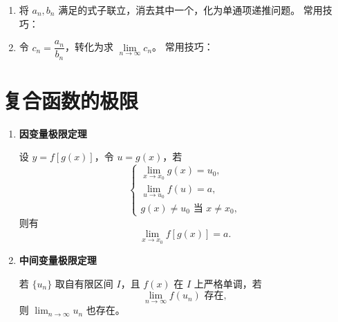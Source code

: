 \begin{enumerate}
    \item 将 $a_n,b_n$ 满足的式子联立，消去其中一个，化为单通项递推问题。
          常用技巧：

    \item 令 $c_n = \dfrac{a_n}{b_n}$，转化为求 $\lim\limits_{n\to\infty} c_n$。
          常用技巧：
\end{enumerate}

\section{复合函数的极限}
\DTwoOne

\begin{enumerate}
    \item \textbf{因变量极限定理}

          设 $y=f[g(x)]$，令 $u=g(x)$，若
          \[
              \begin{cases}
                  \displaystyle \lim_{x\to x_0} g(x) = u_0, \\[3pt]
                  \displaystyle \lim_{u\to u_0} f(u) = a,   \\[3pt]
                  g(x)\ne u_0 \text{ 当 } x\ne x_0,
              \end{cases}
          \]
          则有
          \[
              \lim_{x\to x_0} f[g(x)] = a.
          \]

    \item \textbf{中间变量极限定理}

          若 $\{u_n\}$ 取自有限区间 $I$，且 $f(x)$ 在 $I$ 上严格单调，若
          \[
              \lim_{n\to\infty} f(u_n) \text{ 存在},
          \]
          则 $\lim_{n\to\infty} u_n$ 也存在。
\end{enumerate}